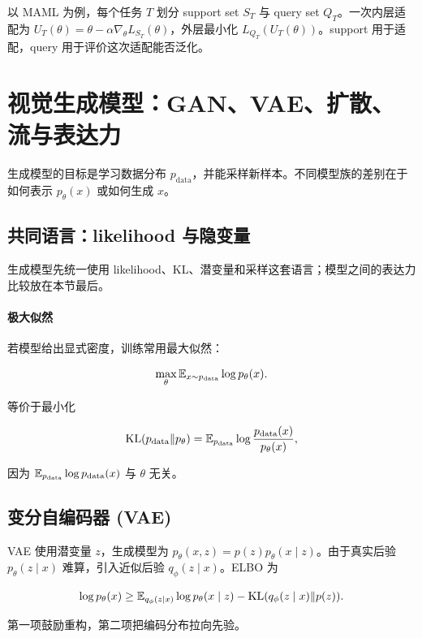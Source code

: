 以 MAML 为例，每个任务 \(T\) 划分 support set \(S_T\) 与 query set \(Q_T\)。一次内层适配为 \(U_T(\theta)=\theta-\alpha\nabla_\theta L_{S_T}(\theta)\)，外层最小化 \(L_{Q_T}(U_T(\theta))\)。support 用于适配，query 用于评价这次适配能否泛化。

\section{视觉生成模型：GAN、VAE、扩散、流与表达力}


生成模型的目标是学习数据分布 \(p_{\mathrm{data}}\)，并能采样新样本。不同模型族的差别在于如何表示 \(p_\theta(x)\) 或如何生成 \(x\)。

\subsection{共同语言：likelihood 与隐变量}

生成模型先统一使用 likelihood、KL、潜变量和采样这套语言；模型之间的表达力比较放在本节最后。

\paragraph{极大似然}

若模型给出显式密度，训练常用最大似然：

\[
  \max_\theta
  \mathbb{E}_{x\sim p_{\mathrm{data}}}
  \log p_\theta(x).
\]

等价于最小化

\[
  \operatorname{KL}(p_{\mathrm{data}}\|p_\theta)
  =
  \mathbb{E}_{p_{\mathrm{data}}}
  \log
  \frac{p_{\mathrm{data}}(x)}{p_\theta(x)},
\]

因为 \(\mathbb{E}_{p_{\mathrm{data}}}\log p_{\mathrm{data}}(x)\) 与 \(\theta\) 无关。

\subsection{变分自编码器 (VAE)}


VAE 使用潜变量 \(z\)，生成模型为 \(p_\theta(x,z)=p(z)p_\theta(x\mid z)\)。由于真实后验 \(p_\theta(z\mid x)\) 难算，引入近似后验 \(q_\phi(z\mid x)\)。ELBO 为

\[
  \log p_\theta(x)
  \ge
  \mathbb{E}_{q_\phi(z\mid x)}
  \log p_\theta(x\mid z)
  -
  \operatorname{KL}(q_\phi(z\mid x)\|p(z)).
\]

第一项鼓励重构，第二项把编码分布拉向先验。

